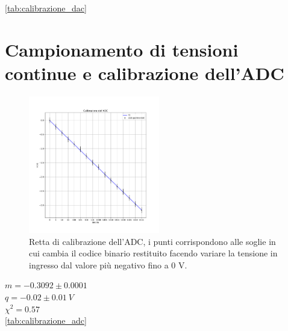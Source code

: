 \documentclass[journal]{IEEEtran}
\begin{document}
\ref{tab:calibrazione_dac}


\section{Campionamento di tensioni continue e calibrazione dell'ADC}

\begin{figure}[t]%
\centering
\begin{center}
\includegraphics[width=0.51\textwidth]{analysis/output/calibrazione_adc.pdf}
\end{center}
\caption{Retta di calibrazione dell'ADC, i punti corrispondono alle soglie in cui cambia il codice binario restituito facendo variare la tensione in ingresso dal valore più negativo fino a 0 V.}
\label{fig:graph_calibrazione_adc}
\end{figure}

$ m = -0.3092 \pm 0.0001 $ \\
$ q = -0.02 \pm 0.01 \ V$ \\
$ \chi^{2} = 0.57 $ \\

\ref{tab:calibrazione_adc}
\end{document}
